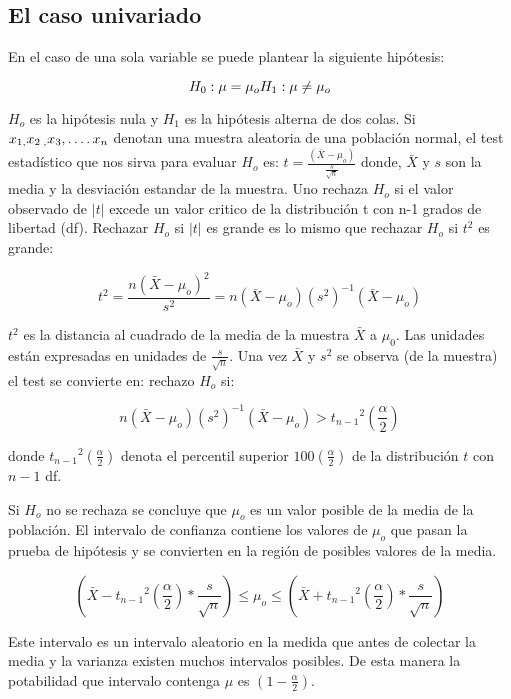 \documentclass[
]{article}
\begin{document}
\subsection{El caso univariado}\label{el-caso-univariado}

En el caso de una sola variable se puede plantear la siguiente
hipótesis:

\[
H_0:\mu = \mu_o \\
H_1:\mu \neq \mu_o
\]

\(H_o\) es la hipótesis nula y \(H_1\) es la hipótesis alterna de dos
colas. Si \(x_{1,} x_{2\;,} x_3 ,\ldotp \ldotp \ldotp \ldotp x_n\)
denotan una muestra aleatoria de una población normal, el test
estadístico que nos sirva para evaluar \(H_o\) es:
\(t=\frac{\left(\bar{X} -\mu_o \right)}{\frac{s}{\sqrt{n}}}\) donde,
\(\bar{X}\) y \(s\) son la media y la desviación estandar de la muestra.
Uno rechaza \(H_o\) si el valor observado de \(\left|t\right|\) excede
un valor critico de la distribución t con n-1 grados de libertad (df).
Rechazar \(H_o\) si \(\left|t\right|\) es grande es lo mismo que
rechazar \(H_o\) si \(t^2\) es grande:

\[
t^2 =\frac{{n\left(\bar{X} -\mu_o \right)}^2 }{s^2 }=n\left(\bar{X} -\mu_o \right){\left(s^2 \right)}^{-1} \left(\bar{X} -\mu_o \right)
\]

\(t^2\) es la distancia al cuadrado de la media de la muestra
\(\bar{X}\) a \(\mu_{0}\). Las unidades están expresadas en unidades de
\(\frac{s}{\sqrt{n}}\). Una vez \(\bar{X}\) y \(s^2\) se observa (de la
muestra) el test se convierte en: rechazo \(H_o\) si:

\[
n\left(\bar{X} -\mu_o \right){\left(s^2 \right)}^{-1} \left(\bar{X} -\mu_o \right)>{t_{n-1} }^2 \left(\frac{\alpha }{2}\right)
\]

donde \({t_{n-1} }^2 \left(\frac{\alpha }{2}\right)\) denota el
percentil superior \(100\left(\frac{\alpha }{2}\right)\) de la
distribución \(t\) con \(n-1\) df.

Si \(H_o\) no se rechaza se concluye que \(\mu_o\) es un valor posible
de la media de la población. El intervalo de confianza contiene los
valores de \(\mu_o\) que pasan la prueba de hipótesis y se convierten en
la región de posibles valores de la media.

\[ 
\left(\bar{X} -{t_{n-1} }^2 \left(\frac{\alpha }{2}\right)*\frac{s}{\sqrt{n}}\right)\le \mu_o \le \left(\bar{X} +{t_{n-1} }^2 \left(\frac{\alpha }{2}\right)*\frac{s}{\sqrt{n}}\right) 
\]

Este intervalo es un intervalo aleatorio en la medida que antes de
colectar la media y la varianza existen muchos intervalos posibles. De
esta manera la potabilidad que intervalo contenga \(\mu\) es
\(\left(1-\frac{\alpha }{2}\right)\).
\end{document}
